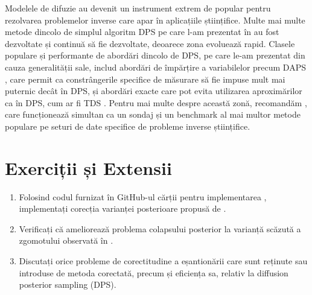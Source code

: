\documentclass[../../book-main_ro.tex]{subfiles}
\begin{document}
Modelele de difuzie au devenit un instrument extrem de popular pentru rezolvarea problemelor
inverse care apar în aplicațiile științifice. Multe mai multe metode dincolo de simplul
algoritm DPS pe care l-am prezentat în  au fost
dezvoltate și continuă să fie dezvoltate, deoarece zona evoluează rapid.
Clasele populare și performante de abordări dincolo de DPS, pe care le-am prezentat
din cauza generalității sale, includ abordări de împărțire a variabilelor precum DAPS
\cite{Zhang2024-ha},
care permit ca constrângerile specifice de măsurare să fie impuse mult mai
puternic decât în DPS, și abordări exacte care pot evita utilizarea
aproximărilor ca în DPS, cum ar fi TDS \cite{wu2023practical}.
Pentru mai multe despre această zonă, recomandăm \cite{zheng2025inversebench}, care
funcționează simultan ca un sondaj și un benchmark al mai multor metode populare
pe seturi de date specifice de probleme inverse științifice.

\section{Exerciții și Extensii}


\begin{exercise}

  \begin{enumerate}
    \item Folosind codul furnizat în GitHub-ul cărții pentru implementarea
      , implementați
      corecția varianței posterioare propusă de \textcite{rozet2024learning}.
    \item Verificați că ameliorează problema colapsului posterior la varianță
      scăzută a zgomotului observată în
      .
    \item Discutați orice probleme de corectitudine a eșantionării care sunt reținute sau
      introduse de metoda corectată, precum și eficiența sa, relativ la
      diffusion posterior sampling (DPS).
  \end{enumerate}

\end{exercise}
\end{document}
